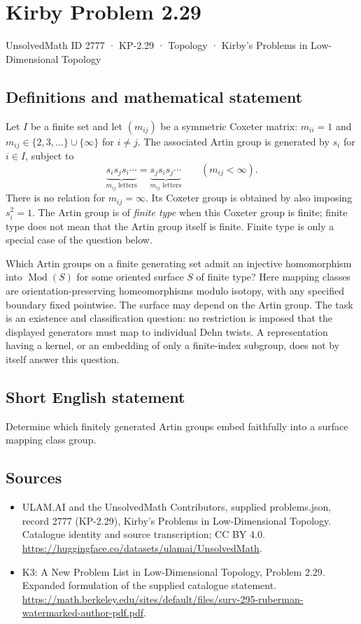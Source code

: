 \documentclass[11pt,a4paper]{article}
\begin{document}
\section*{Kirby Problem 2.29}\label{2777}
{\small UnsolvedMath ID 2777 · KP-2.29 · Topology · Kirby's Problems in Low-Dimensional Topology}
\subsection{Definitions and mathematical statement}
Let $I$ be a finite set and let $(m_{ij})$ be a symmetric Coxeter matrix:
$m_{ii}=1$ and $m_{ij}\in\{2,3,\ldots\}\cup\{\infty\}$ for $i\ne j$.
The associated Artin group is generated by $s_i$ for $i\in I$, subject to
\[
 \underbrace{s_i s_j s_i\cdots}_{m_{ij}\text{ letters}}
 =\underbrace{s_j s_i s_j\cdots}_{m_{ij}\text{ letters}}
 \qquad(m_{ij}<\infty).
\]
There is no relation for $m_{ij}=\infty$. Its Coxeter group is obtained by
also imposing $s_i^2=1$. The Artin group is of \emph{finite type} when this
Coxeter group is finite; finite type does not mean that the Artin group itself
is finite. Finite type is only a special case of the question below.

Which Artin groups on a finite generating set admit an injective homomorphism into
$\operatorname{Mod}(S)$ for some oriented surface $S$ of finite type?
Here mapping classes are orientation-preserving homeomorphisms modulo isotopy,
with any specified boundary fixed pointwise. The surface may depend on the
Artin group. The task is an existence and classification question: no restriction
is imposed that the displayed generators must map to individual Dehn twists.
A representation having a kernel, or an embedding of only a finite-index
subgroup, does not by itself answer this question.
\subsection{Short English statement}
Determine which finitely generated Artin groups embed faithfully into a surface mapping class group.
\subsection{Sources}
\begin{itemize}
\item[S1] ULAM.AI and the UnsolvedMath Contributors, supplied problems.json, record 2777 (KP-2.29), Kirby's Problems in Low-Dimensional Topology. Catalogue identity and source transcription; CC BY 4.0.
\url{https://huggingface.co/datasets/ulamai/UnsolvedMath}.
\item[S2] K3: A New Problem List in Low-Dimensional Topology, Problem 2.29. Expanded formulation of the supplied catalogue statement.
\url{https://math.berkeley.edu/sites/default/files/surv-295-ruberman-watermarked-author-pdf.pdf}.
\end{itemize}
\end{document}
